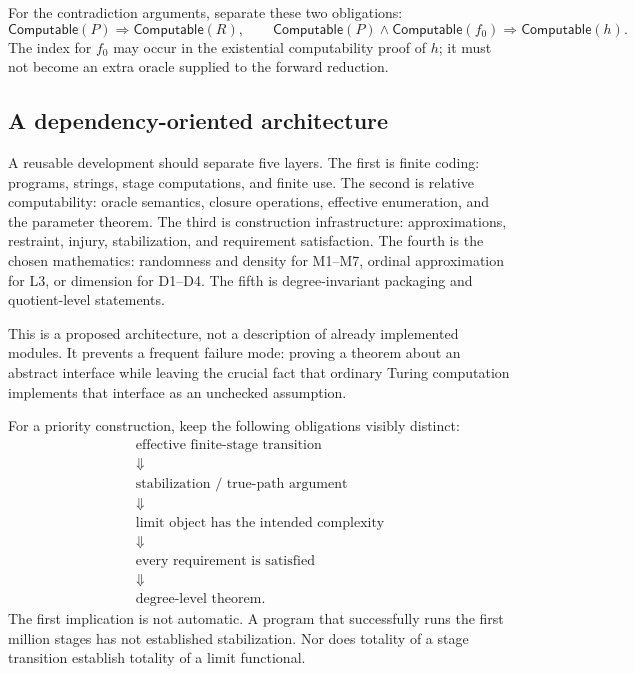 \documentclass[11pt,a4paper]{article}
\theoremstyle{definition}\newtheorem{definition}[theorem]{Definition}
\theoremstyle{remark}\newtheorem{remark}[theorem]{Remark}
\begin{document}
For the contradiction arguments, separate these two obligations:
\[
 \mathsf{Computable}(P)\Longrightarrow\mathsf{Computable}(R),
 \qquad
 \mathsf{Computable}(P)\land\mathsf{Computable}(f_0)
       \Longrightarrow\mathsf{Computable}(h).
\]
The index for $f_0$ may occur in the existential computability proof of $h$;
it must not become an extra oracle supplied to the forward reduction.

\subsection{A dependency-oriented architecture}

A reusable development should separate five layers. The first is finite coding: programs, strings, stage computations, and finite use. The second is relative computability: oracle semantics, closure operations, effective enumeration, and the parameter theorem. The third is construction infrastructure: approximations, restraint, injury, stabilization, and requirement satisfaction. The fourth is the chosen mathematics: randomness and density for M1--M7, ordinal approximation for L3, or dimension for D1--D4. The fifth is degree-invariant packaging and quotient-level statements.

This is a proposed architecture, not a description of already implemented modules. It prevents a frequent failure mode: proving a theorem about an abstract interface while leaving the crucial fact that ordinary Turing computation implements that interface as an unchecked assumption.

For a priority construction, keep the following obligations visibly distinct:
\[
\begin{array}{c}
\text{effective finite-stage transition}\\[2pt]
\Downarrow\\[2pt]
\text{stabilization / true-path argument}\\[2pt]
\Downarrow\\[2pt]
\text{limit object has the intended complexity}\\[2pt]
\Downarrow\\[2pt]
\text{every requirement is satisfied}\\[2pt]
\Downarrow\\[2pt]
\text{degree-level theorem.}
\end{array}
\]
The first implication is not automatic. A program that successfully runs the first million stages has not established stabilization. Nor does totality of a stage transition establish totality of a limit functional.
\end{document}
